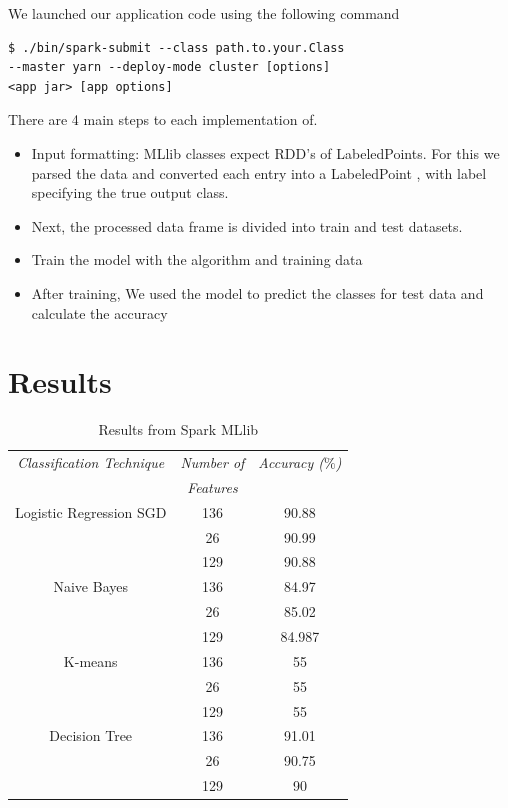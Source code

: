 \documentclass[9pt,twocolumn,twoside]{styles/osajnl}
\begin{document}
We launched our application code using the following command
\begin{verbatim}
$ ./bin/spark-submit --class path.to.your.Class 
--master yarn --deploy-mode cluster [options] 
<app jar> [app options]
\end{verbatim}

 There are 4 main steps to each implementation of.
 \begin{itemize}
  \item Input formatting: MLlib classes expect RDD’s of LabeledPoints. For this we parsed the data and converted each entry into a LabeledPoint , with label specifying the true output class.
\item Next, the processed data frame is divided into train and test datasets.
\item Train the model with the algorithm and training data
\item After  training, We used the model to predict the classes for test data and calculate the accuracy
 \end{itemize}

\section{Results}
\begin{table}[h!]
\centering
\caption{Results from Spark MLlib}
 \begin{tabular}{|c c c|} 
 \hline
 \textit{Classification Technique} & \textit{Number of} & \textit{Accuracy ($\%$)}\\
 & \textit{Features} &\\
 \hline
 \hline 
  Logistic Regression SGD\cite{www-mllibsgd} & 136 & 90.88
 \\  & 26 & 90.99\\
  & 129 & 90.88\\
 \hline 
  Naive Bayes\cite{www-mllibgnb} & 136 & 84.97
 \\  & 26 & 85.02\\
  & 129 & 84.987
\\ 
 \hline 
   K-means\cite{www-mllibkmeans} & 136 & 55
 \\ 
   & 26 & 55\\
  & 129 & 55\\ 
 \hline 
Decision Tree\cite{www-mllibdtc} & 136 & 91.01 \\ & 26 & 90.75\\
  & 129 & 90\\
\hline 
\end{tabular}
\label{table:mllib}
\end{table}
\end{document}
